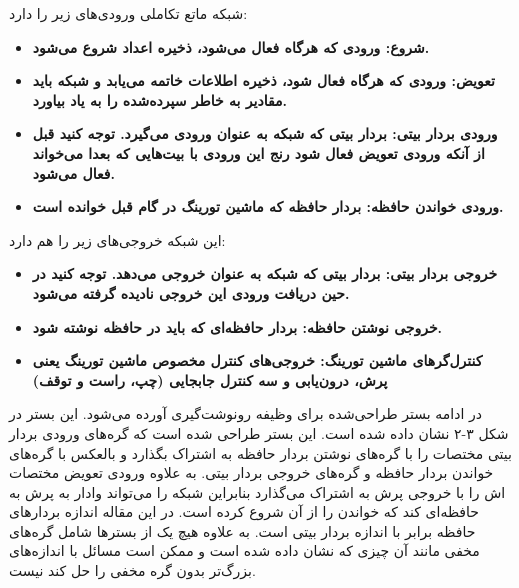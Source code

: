 شبکه ماتع تکاملی ورودی‌های زیر را دارد:
\begin{itemize}
\item \bf{شروع}: ورودی که هرگاه فعال می‌شود، ذخیره اعداد شروع می‌شود.
\item \bf{تعویض}: ورودی که هرگاه فعال شود، ذخیره اطلاعات خاتمه می‌یابد و شبکه باید مقادیر به خاطر سپرده‌شده را به یاد بیاورد.
\item \bf{ورودی بردار بیتی}: بردار بیتی که شبکه به عنوان ورودی می‌گیرد. توجه کنید قبل از آنکه ورودی تعویض فعال شود رنج این ورودی با بیت‌هایی که بعدا می‌خواند فعال می‌شود.
\item \bf{ورودی خواندن حافظه}: بردار حافظه که ماشین تورینگ در گام قبل خوانده است.\cite{merrild2018hyperntm}
\end{itemize}

این شبکه خروجی‌های زیر را هم دارد:
\begin{itemize}
\item \bf{خروجی بردار بیتی}: بردار بیتی که شبکه به عنوان خروجی می‌دهد. توجه کنید در حین دریافت ورودی این خروجی نادیده گرفته می‌شود.
\item \bf{خروجی نوشتن حافظه}: بردار حافظه‌ای که باید در حافظه نوشته شود.
\item \bf{کنترل‌گر‌های ماشین تورینگ}: خروجی‌های کنترل مخصوص ماشین تورینگ یعنی پرش، درون‌یابی و سه کنترل جابجایی (چپ، راست و توقف)\cite{merrild2018hyperntm} 
\end{itemize}

در ادامه بستر طراحی‌شده برای وظیفه رونوشت‌گیری آورده می‌شود. این بستر در شکل ۳-۲ نشان داده شده است. این بستر طراحی شده است که گره‌های ورودی بردار بیتی مختصات  را با گره‌های نوشتن بردار حافظه به اشتراک بگذارد و بالعکس با گره‌های خواندن بردار حافظه و گره‌های خروجی بردار بیتی.
به علاوه ورودی تعویض مختصات  اش را با خروجی پرش به اشتراک می‌گذارد بنابراین شبکه را می‌تواند وادار به پرش به حافظه‌ای کند که خواندن را از آن شروع کرده است. در این مقاله اندازه بردارهای حافظه برابر با اندازه بردار بیتی است. 
به علاوه هیچ یک از بسترها شامل گره‌های مخفی مانند آن چیزی که نشان داده شده است و ممکن است مسائل  با اندازه‌های بزرگ‌تر بدون گره مخفی را حل کند نیست.\cite{merrild2018hyperntm}

